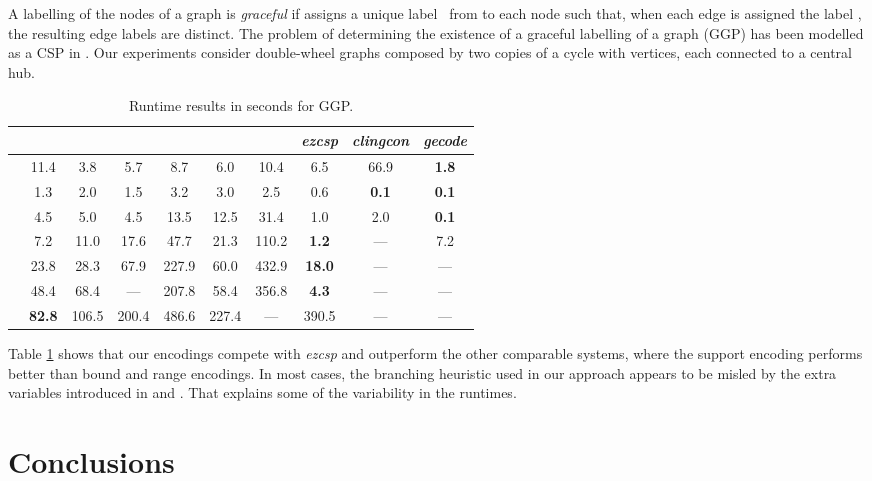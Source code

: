 \documentclass{tlp}
\newcommand{\systemname}[1]{\emph{#1}}
\newcommand{\encsup}{}
\newcommand{\encbou}{}
\newcommand{\encran}{}
\newcommand{\encbouh}[1]{\encbou}
\newcommand{\encranh}[1]{\encran}
\begin{document}
A labelling  of the nodes of a graph  is \emph{graceful} if  assigns a unique label~ from  to each node  such that, when each edge  is assigned the label , the resulting edge labels are distinct. The problem of determining the existence of a graceful labelling of a graph (GGP) has been modelled as a CSP in . Our experiments consider double-wheel graphs  composed by two copies of a cycle with  vertices, each connected to a central hub.
\begin{table}
\caption{Runtime results in seconds for GGP.}
\label{tab:ggp}
\begin{minipage}{\textwidth}
\begin{tabular}{cccccccccc} \hline\hline
 & \encsup & \encbouh{1} & \encbouh{3} & \encbou & \encranh{3} & \encran & \systemname{ezcsp} & \systemname{clingcon} & \systemname{gecode} \\ \hline
 & 11.4 &  3.8 &  5.7 &  8.7 &  6.0 & 10.4 & 6.5 & 66.9 & \textbf{1.8} \\
 &  1.3 &  2.0 &  1.5 &  3.2 &  3.0 &  2.5 & 0.6 & \textbf{0.1} & \textbf{0.1} \\
 &  4.5 &  5.0 &  4.5 & 13.5 & 12.5 & 31.4 & 1.0 & 2.0 & \textbf{0.1} \\
 &  7.2 & 11.0 & 17.6 & 47.7 & 21.3 &110.2 & \textbf{1.2} & --- & 7.2 \\
 & 23.8 & 28.3 & 67.9 &227.9 & 60.0 &432.9 & \textbf{18.0} & --- & --- \\
 & 48.4 & 68.4 & ---  &207.8 & 58.4 &356.8 & \textbf{4.3} & --- & --- \\
 & \textbf{82.8} &106.5 &200.4 &486.6 &227.4 & ---  & 390.5 & --- & --- \\ \hline\hline
\end{tabular}
\vspace{-2\baselineskip}
\end{minipage}
\end{table}
Table \ref{tab:ggp} shows that our encodings compete with \systemname{ezcsp} and outperform the other comparable systems, where the support encoding performs better than bound and range encodings. In most cases, the branching heuristic used in our approach appears to be misled by the extra variables introduced in  and . That explains some of the variability in the runtimes.


\section{Conclusions} \label{sec:con}
\end{document}
